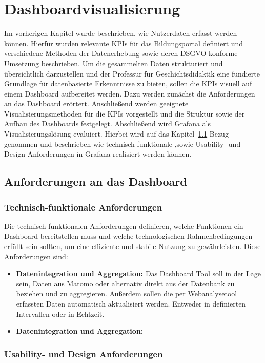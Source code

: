 \chapter{Dashboardvisualisierung} %
\label{ch:auswahl}
Im vorherigen Kapitel wurde beschrieben, wie Nutzerdaten erfasst werden können. Hierfür wurden relevante KPIs für das Bildungsportal definiert und verschiedene Methoden der Datenerhebung sowie deren DSGVO-konforme Umsetzung beschrieben. Um die gesammelten Daten strukturiert und übersichtlich darzustellen und der Professur für Geschichtsdidaktik eine fundierte Grundlage für datenbasierte Erkenntnisse zu bieten, sollen die KPIs visuell auf einem Dashboard aufbereitet werden. Dazu werden zunächst die Anforderungen an das Dashboard erörtert. Anschließend werden geeignete Visualisierungsmethoden für die KPIs vorgestellt und die Struktur sowie der Aufbau des Dashboards festgelegt. Abschließend wird Grafana als Visualisierungslösung evaluiert. Hierbei wird auf das Kapitel~\ref{sec:anforderungen} Bezug genommen und beschrieben wie technisch-funktionale-,sowie Usability- und Design Anforderungen in Grafana realisiert werden können. 

\section{Anforderungen an das Dashboard}
\label{sec:anforderungen}
\subsection{Technisch-funktionale Anforderungen}
Die technisch-funktionalen Anforderungen definieren, welche Funktionen ein Dashboard bereitstellen muss und welche technologischen Rahmenbedingungen erfüllt sein sollten, um eine effiziente und stabile Nutzung zu gewährleisten. Diese Anforderungen sind: 
\begin{itemize}
    \item \textbf{Datenintegration und Aggregation:} Das Dashboard Tool soll in der Lage sein, Daten aus Matomo oder alternativ direkt aus der Datenbank zu beziehen und zu aggregieren. Außerdem sollen die per Webanalysetool erfassten Daten automatisch aktualisiert werden. Entweder in definierten Intervallen oder in Echtzeit.
    \item \textbf{Datenintegration und Aggregation:}
\end{itemize}

\subsection{Usability- und Design Anforderungen}

